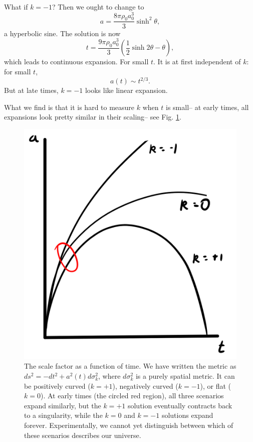 What if $k=-1$? Then we ought to change to $$a=\frac{8\pi\rho_0 a_0^3}{3}\sinh^2 \theta,$$
a hyperbolic sine. The solution is now
$$t=\frac{9\pi\rho_0 a_0^3}{3}(\frac{1}{2}\sinh 2\theta -\theta),$$
which leads to continuous expansion. For small $t$. It is at first independent of $k$: for small $t$,
$$a(t)\sim t^{2/3}.$$
But at late times, $k=-1$ looks like linear expansion.

What we find is that it is hard to measure $k$ when $t$ is small-- at early times, all expansions look pretty similar in their scaling-- see Fig. \ref{fig:flrw_metric}.

\begin{figure}
    \centering
    \includegraphics{2018/11/20181114_scalefactor.png}
    \caption{The scale factor as a function of time. We have written the metric as $ds^2=-dt^2 +a^2(t) d\sigma_k^2$, where $d\sigma_k^2$ is a purely spatial metric. It can be positively curved ($k=+1$), negatively curved ($k=-1$), or flat ($k=0$). At early times (the circled red region), all three scenarios expand similarly, but the $k=+1$ solution eventually contracts back to a singularity, while the $k=0$ and $k=-1$ solutions expand forever. Experimentally, we cannot yet distinguish between which of these scenarios describes our universe.}
    \label{fig:flrw_metric}
\end{figure}

